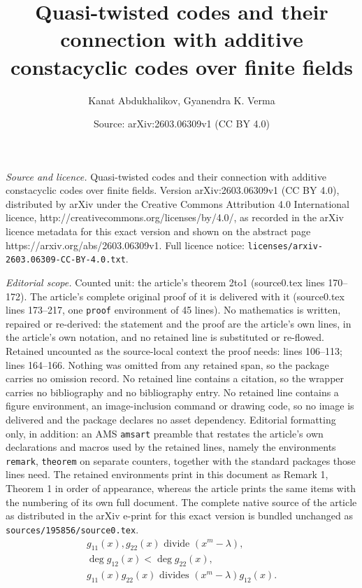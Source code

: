 \documentclass[10pt,a4paper]{amsart}
\title{Quasi-twisted codes and their connection with additive constacyclic codes over finite fields}
\author{Kanat Abdukhalikov, Gyanendra K. Verma}
\date{Source: arXiv:2603.06309v1 (CC BY 4.0)}
\begin{document}
\maketitle

\noindent\emph{Source and licence.} Quasi-twisted codes and their connection with additive constacyclic codes over finite fields. Version arXiv:2603.06309v1 (CC BY 4.0), distributed by arXiv under the Creative Commons Attribution 4.0 International licence, http://creativecommons.org/licenses/by/4.0/, as recorded in the arXiv licence metadata for this exact version and shown on the abstract page https://arxiv.org/abs/2603.06309v1. Full licence notice: \texttt{licenses/arxiv-2603.06309-CC-BY-4.0.txt}.\par\smallskip

\noindent\textit{Editorial scope.} Counted unit: the article's theorem 2to1 (source0.tex lines 170--172). The article's complete original proof of it is delivered with it (source0.tex lines 173--217, one \texttt{proof} environment of 45 lines). No mathematics is written, repaired or re-derived: the statement and the proof are the article's own lines, in the article's own notation, and no retained line is substituted or re-flowed.  Retained uncounted as the source-local context the proof needs: lines 106--113; lines 164--166.  Nothing was omitted from any retained span, so the package carries no omission record.  No retained line contains a citation, so the wrapper carries no bibliography and no bibliography entry.  No retained line contains a figure environment, an image-inclusion command or drawing code, so no image is delivered and the package declares no asset dependency.  Editorial formatting only, in addition: an AMS \texttt{amsart} preamble that restates the article's own declarations and macros used by the retained lines, namely the environments \texttt{remark}, \texttt{theorem} on separate counters, together with the standard packages those lines need.  The retained environments print in this document as Remark 1, Theorem 1 in order of appearance, whereas the article prints the same items with the numbering of its own full document.  The complete native source of the article as distributed in the arXiv e-print for this exact version is bundled unchanged as \texttt{sources/195856/source0.tex}.
    \begin{equation}\label{eqqt}
    \begin{split}
       g_{11}(x),g_{22}(x)\text{ divide } (x^m-\lambda), \\
       \deg g_{12}(x)< \deg g_{22}(x),\\
       g_{11}(x)g_{22}(x)\text{ divides } (x^m-\lambda)g_{12}(x).
    \end{split}        
    \end{equation} 
\end{document}
